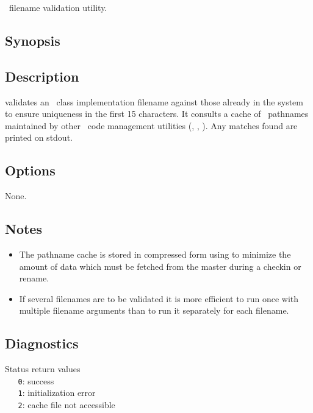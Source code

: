\aipspp\ filename validation utility.

\subsection*{Synopsis}

\begin{synopsis}
\end{synopsis}

\subsection*{Description}

 validates an \aipspp\ class implementation filename against those
already in the system to ensure uniqueness in the first 15 characters.  It
consults a cache of \aipspp\ pathnames maintained by other \aipspp\ 
code management utilities (, , ).  Any
matches found are printed on stdout.

\subsection*{Options}

None.

\subsection*{Notes}

\begin{itemize}
\item
   The pathname cache is stored in compressed form using  to
   minimize the amount of data which must be fetched from the master during a
   checkin or rename.

\item
   If several filenames are to be validated it is more efficient to run
   \exe{av} once with multiple filename arguments than to run it separately
   for each filename.
\end{itemize}

\subsection*{Diagnostics}

Status return values
\\ \verb+   0+: success
\\ \verb+   1+: initialization error
\\ \verb+   2+: cache file not accessible


